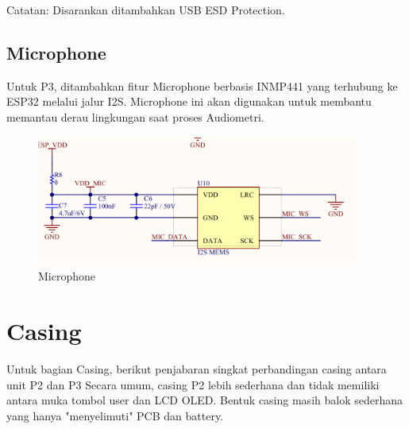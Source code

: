 \documentclass{book} %
\begin{document}
	Catatan: Disarankan ditambahkan USB ESD Protection.
    
    \newpage
    \section{Microphone}
    
    Untuk P3, ditambahkan fitur Microphone berbasis INMP441 yang terhubung ke ESP32 melalui jalur I2S.
    Microphone ini akan digunakan untuk membantu memantau derau lingkungan saat proses Audiometri.
    
    \begin{figure}[!ht]
    	\centering
    	\includegraphics[width=300pt]{images/p3_mic}
    	\caption{Microphone}
    \end{figure}
    
    \chapter{Casing}
    
    Untuk bagian Casing, berikut penjabaran singkat perbandingan casing antara unit P2 dan P3
    Secara umum, casing P2 lebih sederhana dan tidak memiliki antara muka tombol user dan LCD OLED.
    Bentuk casing masih balok sederhana yang hanya "menyelimuti" PCB dan battery.
    
\end{document}
